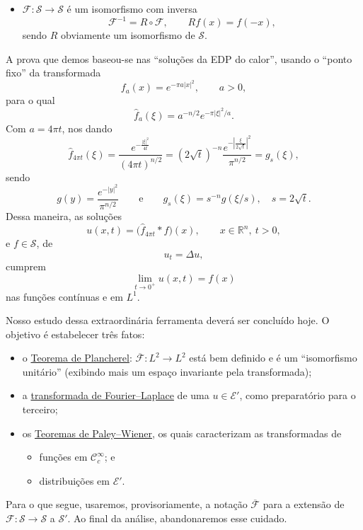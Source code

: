 \documentclass[../distribution_theory_notes.tex]{subfiles}
\begin{document}
\begin{itemize}
	\item[(iii)] \(\mathcal{F}:\mathcal{S}\longrightarrow\mathcal{S}\) é um isomorfismo com inversa
	      \[
		      \mathcal{F}^{-1}=R\circ\mathcal{F},
		      \qquad Rf(x)=f(-x),
	      \]
	      sendo \(R\) obviamente um isomorfismo de \(\mathcal{S}\).
\end{itemize}

A prova que demos baseou-se nas ``soluções da EDP do calor'', usando o ``ponto fixo'' da transformada
\[
	f_a(x)=e^{-\pi a|x|^2},\qquad a>0,
\]
para o qual
\[
	\hat f_a(\xi)=a^{-n/2}e^{-\pi|\xi|^2/a}.
\]
Com \(a=4\pi t\), nos dando
\[
	\hat f_{4\pi t}(\xi)
	=\frac{e^{-\frac{|\xi|^2}{4t}}}{(4\pi t)^{n/2}}
	=(2\sqrt{t})^{-n}\frac{e^{-\left|\frac{\xi}{2\sqrt{t}}\right|^2}}{\pi^{n/2}}
	=g_s(\xi),
\]
sendo
\[
	g(y)=\frac{e^{-|y|^2}}{\pi^{n/2}}
	\qquad\text{e}\qquad
	g_s(\xi)=s^{-n}g(\xi/s),\quad s=2\sqrt{t}.
\]
Dessa maneira, as soluções
\[
	u(x,t)=\bigl(\hat f_{4\pi t}*f\bigr)(x),
	\qquad x\in\mathbb{R}^n,\ t>0,
\]
e \(f\in\mathcal{S}\), de
\[
	u_t=\Delta u,
\]
cumprem
\[
	\lim_{t\to0^+}u(x,t)=f(x)
\]
nas funções contínuas e em \(L^1\).

Nosso estudo dessa extraordinária ferramenta deverá ser concluído hoje. O objetivo é estabelecer três fatos:
\begin{itemize}
	\item[(i)] o \underline{Teorema de Plancherel}: \(\overline{\mathcal{F}}:L^2\longrightarrow L^2\) está bem definido e é um ``isomorfismo unitário'' (exibindo mais um espaço invariante pela transformada);
	\item[(ii)] a \underline{transformada de Fourier--Laplace} de uma \(u\in\mathcal{E}'\), como preparatório para o terceiro;
	\item[(iii)] os \underline{Teoremas de Paley--Wiener}, os quais caracterizam as transformadas de
	      \begin{itemize}
		      \item[(1$^\circ$)] funções em \(\mathcal{C}_c^\infty\); e
		      \item[(2$^\circ$)] distribuições em \(\mathcal{E}'\).
	      \end{itemize}
\end{itemize}

\begin{tcolorbox}[
		skin=enhanced,
		title=Observação,
		fonttitle=\bfseries,
		colframe=black,
		colbacktitle=cyan!75!white,
		colback=cyan!15,
		colbacklower=black,
		coltitle=black,
		drop fuzzy shadow
	]
	Para o que segue, usaremos, provisoriamente, a notação \(\overline{\mathcal{F}}\) para a extensão de \(\mathcal{F}:\mathcal{S}\to\mathcal{S}\) a \(\mathcal{S}'\). Ao final da análise, abandonaremos esse cuidado.
\end{tcolorbox}
\end{document}
